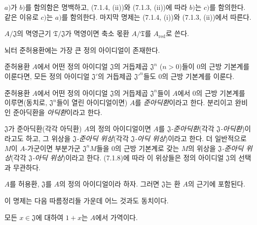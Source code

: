 $a)$가 $b)$를 함의함은 명백하고, (7.1.4, (ii))와 (7.1.3, (ii))에
따라 $b)$는 $c)$를 함의한다. 같은 이유로 $c)$는 $a)$를 함의한다.
마지막 명제는 (7.1.4, (i))와 (7.1.3, (ii))에서 따른다.

$A/\mathfrak J$의 멱영근기 $\mathfrak T/\mathfrak J$가 멱영이면
축소 몫환 $A/\mathfrak T$를 $A_{\mathrm{red}}$로 쓴다.


\begin{corollary}[7.1.7]
\label{0.7.1.7-ko}
뇌터 준허용환에는 가장 큰 정의 아이디얼이 존재한다.
\end{corollary}

\begin{corollary}[7.1.8]
\label{0.7.1.8-ko}
준허용환 $A$에서 어떤 정의 아이디얼 $\mathfrak J$의 거듭제곱
$\mathfrak J^n$ ($n>0$)들이 $0$의 근방 기본계를 이룬다면, 모든
정의 아이디얼 $\mathfrak J'$의 거듭제곱 ${\mathfrak J'}^n$들도
$0$의 근방 기본계를 이룬다.
\end{corollary}

\begin{definition}[7.1.9]
\label{0.7.1.9-ko}
준허용환 $A$에서 어떤 정의 아이디얼 $\mathfrak J$의 거듭제곱
$\mathfrak J^n$들이 $A$에서 $0$의 근방 기본계를 이루면(동치로,
$\mathfrak J^n$들이 열린 아이디얼이면) $A$를 \emph{준아딕환}이라고
한다. 분리이고 완비인 준아딕환을 \emph{아딕환}이라고 한다.
\end{definition}

$\mathfrak J$가 준아딕환(각각 아딕환) $A$의 정의 아이디얼이면
$A$를 \emph{$\mathfrak J$-준아딕환}(각각
\emph{$\mathfrak J$-아딕환})이라고도 하고, 그 위상을
\emph{$\mathfrak J$-준아딕 위상}(각각
\emph{$\mathfrak J$-아딕 위상})이라고 한다. 더 일반적으로 $M$이
$A$-가군이면 부분가군 $\mathfrak J^nM$들을 $0$의 근방 기본계로
갖는 $M$의 위상을 \emph{$\mathfrak J$-준아딕 위상}(각각
\emph{$\mathfrak J$-아딕 위상})이라고 한다. (7.1.8)에 따라 이
위상들은 정의 아이디얼 $\mathfrak J$의 선택과 무관하다.

\begin{proposition}[7.1.10]
\label{0.7.1.10-ko}
$A$를 허용환, $\mathfrak J$를 $A$의 정의 아이디얼이라 하자. 그러면
$\mathfrak J$는 환 $A$의 근기에 포함된다.
\end{proposition}

이 명제는 다음 따름정리들 가운데 어느 것과도 동치이다.

\begin{corollary}[7.1.11]
\label{0.7.1.11-ko}
모든 $x\in\mathfrak J$에 대하여 $1+x$는 $A$에서 가역이다.
\end{corollary}

